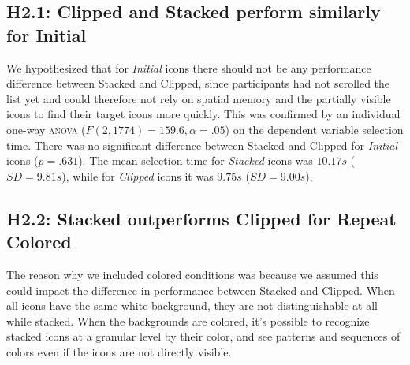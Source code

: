 \documentclass[nobib]{tufte-book} %
\begin{document}
\subsection{H2.1: Clipped and Stacked perform similarly for Initial}
We hypothesized that for \emph{Initial} icons there should not be any performance difference between Stacked and Clipped, since participants had not scrolled the list yet and could therefore not rely on spatial memory and the partially visible icons to find their target icons more quickly. This was confirmed by an individual one-way \textsc{anova} ($F(2,1774) = 159.6, \alpha = .05$) on the dependent variable selection time. There was no significant difference between Stacked and Clipped for \emph{Initial} icons ($p = .631$). The mean selection time for \emph{Stacked} icons was $10.17 s$ ($SD = 9.81 s$), while for \emph{Clipped} icons it was $9.75 s$ ($SD = 9.00 s$).

\subsection{H2.2: Stacked outperforms Clipped for Repeat Colored}
The reason why we included colored conditions was because we assumed this could impact the difference in performance between Stacked and Clipped. When all icons have the same white background, they are not distinguishable at all while stacked. When the backgrounds are colored, it's possible to recognize stacked icons at a granular level by their color, and see patterns and sequences of colors even if the icons are not directly visible.
\end{document}
